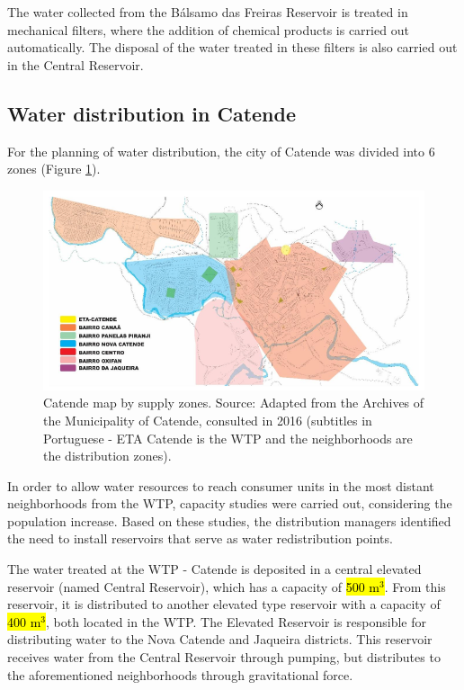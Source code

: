 \documentclass{singlecol}
\theoremstyle{TH}{
\newtheorem{lemma}{Lemma}
\newtheorem{theorem}[lemma]{Theorem}
\newtheorem{corrolary}[lemma]{Corrolary}
\newtheorem{conjecture}[lemma]{Conjecture}
\newtheorem{proposition}[lemma]{Proposition}
\newtheorem{claim}[lemma]{Claim}
\newtheorem{stheorem}[lemma]{Wrong Theorem}
\newtheorem{algorithm}{Algorithm}
}
\theoremstyle{THrm}{
\newtheorem{definition}{Definition}[section]
\newtheorem{question}{Question}[section]
\newtheorem{remark}{Remark}
\newtheorem{scheme}{Scheme}
}
\theoremstyle{THhit}{
\newtheorem{case}{Case}[section]
}
\begin{document}
The water collected from the Bálsamo das Freiras Reservoir is treated in mechanical filters, where the addition of chemical products is carried out automatically. The disposal of the water treated in these filters is also carried out in the Central Reservoir. 

\subsection{Water distribution in Catende}

For the planning of water distribution, the city of Catende was divided into 6 zones (Figure \ref{fig:SectorsCatende}). 

\begin{figure}[h]
\caption{Catende map by supply zones. Source: Adapted from the Archives of the Municipality of Catende, consulted in 2016 (subtitles in Portuguese - ETA Catende is the WTP and the neighborhoods are the distribution zones).}
\label{fig:SectorsCatende}
\centering
\includegraphics[width=\textwidth]{figures/setores.png}
\end{figure}
 
In order to allow water resources to reach consumer units in the most distant neighborhoods from the WTP, capacity studies were carried out, considering the population increase. Based on these studies, the distribution managers identified the need to install reservoirs that serve as water redistribution points. 

The water treated at the WTP - Catende is deposited in a central elevated reservoir (named Central Reservoir), which has a capacity of \hl{500 m$^3$}. From this reservoir, it is distributed to another elevated type reservoir with a capacity of \hl{400 m$^3$}, both located in the WTP. The Elevated Reservoir is responsible for distributing water to the Nova Catende and Jaqueira districts. This reservoir receives water from the
Central Reservoir through pumping, but distributes to the aforementioned neighborhoods through gravitational force. 
\end{document}
